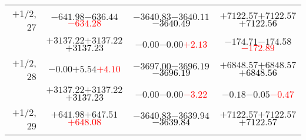 \documentclass[compress]{beamer}
\begin{document}
\begin{frame}
{\begin{tabular}{r | c | c | c}
$+$1/2, 27 & $-641.98$\hspace{0.1 cm}$-636.44$\hspace{0.1 cm}\textcolor{red}{$-634.28$} & $-3640.83$\hspace{0.1 cm}$-3640.11$\hspace{0.1 cm}\textcolor{black}{$-3640.49$} & $+7122.57$\hspace{0.1 cm}$+7122.57$\hspace{0.1 cm}\textcolor{black}{$+7122.56$} \\
           & $+3137.22$\hspace{0.1 cm}$+3137.22$\hspace{0.1 cm}\textcolor{black}{$+3137.23$} & $-0.00$\hspace{0.1 cm}$-0.00$\hspace{0.1 cm}\textcolor{red}{$+2.13$} & $-174.71$\hspace{0.1 cm}$-174.58$\hspace{0.1 cm}\textcolor{red}{$-172.89$} \\
$+$1/2, 28 & $-0.00$\hspace{0.1 cm}$+5.54$\hspace{0.1 cm}\textcolor{red}{$+4.10$} & $-3697.00$\hspace{0.1 cm}$-3696.19$\hspace{0.1 cm}\textcolor{black}{$-3696.19$} & $+6848.57$\hspace{0.1 cm}$+6848.57$\hspace{0.1 cm}\textcolor{black}{$+6848.56$} \\
           & $+3137.22$\hspace{0.1 cm}$+3137.22$\hspace{0.1 cm}\textcolor{black}{$+3137.23$} & $-0.00$\hspace{0.1 cm}$-0.00$\hspace{0.1 cm}\textcolor{red}{$-3.22$} & $-0.18$\hspace{0.1 cm}$-0.05$\hspace{0.1 cm}\textcolor{red}{$-0.47$} \\
$+$1/2, 29 & $+641.98$\hspace{0.1 cm}$+647.51$\hspace{0.1 cm}\textcolor{red}{$+648.08$} & $-3640.83$\hspace{0.1 cm}$-3639.94$\hspace{0.1 cm}\textcolor{black}{$-3639.84$} & $+7122.57$\hspace{0.1 cm}$+7122.57$\hspace{0.1 cm}\textcolor{black}{$+7122.57$} \\

\end{tabular}}
\end{frame}
\end{document}
